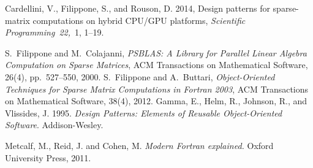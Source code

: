 
\begin{thebibliography}{99}
{ Cardellini, V.}, { Filippone, S.}, { and} { Rouson, D.} 2014,
 Design patterns for sparse-matrix computations on hybrid {CPU/GPU}
  platforms,
{\em Scientific Programming\/}~{\em 22,\/}~1, 1--19.

S.~Filippone and M.~Colajanni, 
{\em PSBLAS: A Library for Parallel Linear Algebra
Computation on Sparse Matrices},
\newblock
ACM Transactions on Mathematical Software, 26(4), pp.~527--550, 2000.
%
S.~Filippone and A.~Buttari, 
{\em Object-Oriented Techniques for Sparse Matrix Computations in Fortran 2003},
\newblock
ACM Transactions on Mathematical Software, 38(4), 2012.
%
{ Gamma, E.}, { Helm, R.}, { Johnson, R.}, { and} { Vlissides,
  J.} 1995.
 {\em Design Patterns: Elements of Reusable Object-Oriented Software}.
 Addison-Wesley.

%
{Metcalf, M., Reid, J. and Cohen, M.}
{\em Modern Fortran  explained.}
{Oxford University Press}, 2011.
%
\end{thebibliography}
